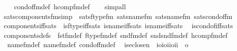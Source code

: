 \begin{isabellebody}
\ \ \ \ cond{\isacharunderscore}{\kern0pt}of{\isacharunderscore}{\kern0pt}fm{\isacharunderscore}{\kern0pt}def\ hcomp{\isacharunderscore}{\kern0pt}fm{\isacharunderscore}{\kern0pt}def\isanewline
\ \ \isamarkupfalse%
\ simp{\isacharunderscore}{\kern0pt}all%
\endisatagproof
{\isafoldproof}%
%
\isadelimproof
\isanewline
%
\endisadelimproof
\isanewline
{}\isamarkupfalse%
\ sats{\isacharunderscore}{\kern0pt}components{\isacharunderscore}{\kern0pt}fm{\isacharbrackleft}{\kern0pt}simp{\isacharbrackright}{\kern0pt}\ {\isacharequal}{\kern0pt}\ sats{\isacharunderscore}{\kern0pt}ftype{\isacharunderscore}{\kern0pt}fm\ sats{\isacharunderscore}{\kern0pt}name{}{\isacharunderscore}{\kern0pt}fm\ sats{\isacharunderscore}{\kern0pt}name{}{\isacharunderscore}{\kern0pt}fm\ sats{\isacharunderscore}{\kern0pt}cond{\isacharunderscore}{\kern0pt}of{\isacharunderscore}{\kern0pt}fm\isanewline
\isanewline
{}\isamarkupfalse%
\ components{\isacharunderscore}{\kern0pt}iff{\isacharunderscore}{\kern0pt}sats\ {\isacharequal}{\kern0pt}\ is{\isacharunderscore}{\kern0pt}ftype{\isacharunderscore}{\kern0pt}iff{\isacharunderscore}{\kern0pt}sats\ is{\isacharunderscore}{\kern0pt}name{}{\isacharunderscore}{\kern0pt}iff{\isacharunderscore}{\kern0pt}sats\ is{\isacharunderscore}{\kern0pt}name{}{\isacharunderscore}{\kern0pt}iff{\isacharunderscore}{\kern0pt}sats\isanewline
\ \ is{\isacharunderscore}{\kern0pt}cond{\isacharunderscore}{\kern0pt}of{\isacharunderscore}{\kern0pt}iff{\isacharunderscore}{\kern0pt}sats\isanewline
\isanewline
{}\isamarkupfalse%
\ components{\isacharunderscore}{\kern0pt}defs\ {\isacharequal}{\kern0pt}\ fst{\isacharunderscore}{\kern0pt}fm{\isacharunderscore}{\kern0pt}def\ ftype{\isacharunderscore}{\kern0pt}fm{\isacharunderscore}{\kern0pt}def\ snd{\isacharunderscore}{\kern0pt}fm{\isacharunderscore}{\kern0pt}def\ snd{\isacharunderscore}{\kern0pt}snd{\isacharunderscore}{\kern0pt}fm{\isacharunderscore}{\kern0pt}def\ hcomp{\isacharunderscore}{\kern0pt}fm{\isacharunderscore}{\kern0pt}def\isanewline
\ \ name{}{\isacharunderscore}{\kern0pt}fm{\isacharunderscore}{\kern0pt}def\ name{}{\isacharunderscore}{\kern0pt}fm{\isacharunderscore}{\kern0pt}def\ cond{\isacharunderscore}{\kern0pt}of{\isacharunderscore}{\kern0pt}fm{\isacharunderscore}{\kern0pt}def\isanewline
\isanewline
\isanewline
{}\isamarkupfalse%
\isanewline
\ \ is{\isacharunderscore}{\kern0pt}eclose{\isacharunderscore}{\kern0pt}n\ {\isacharcolon}{\kern0pt}{\isacharcolon}{\kern0pt}\ {\isachardoublequoteopen}{\isacharbrackleft}{\kern0pt}i{\isasymRightarrow}o{\isacharcomma}{\kern0pt}{\isacharbrackleft}{\kern0pt}i{\isasymRightarrow}o{\isacharcomma}{\kern0pt}i{\isacharcomma}{\kern0pt}i{\isacharbrackright}{\kern0pt}{\isasymRightarrow}o{\isacharcomma}{\kern0pt}i{\isacharcomma}{\kern0pt}i{\isacharbrackright}{\kern0pt}\ {\isasymRightarrow}\ o{\isachardoublequoteclose}\ \isanewline

\end{isabellebody}

